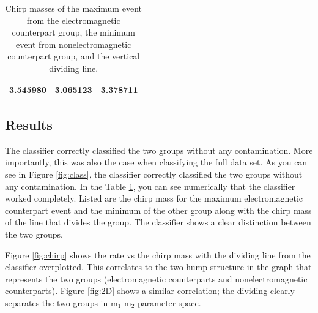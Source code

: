 \begin{table}[ht]
\caption{Chirp masses of the maximum event from the electromagnetic counterpart group, the minimum event from nonelectromagnetic counterpart group, and the vertical dividing line.}
\centering
\begin{tabular}{c c c}

\hline\hline
3.545980 & 3.065123 & 3.378711\\
\hline\hline
\end{tabular}
\label{tab:mass}
\end{table}

\subsection{Results}
The classifier correctly classified the two groups without any contamination. More importantly, this was also the case when classifying the full data set. As you can see in Figure \ref{fig:class}, the classifier correctly classified the two groups without any contamination. In the Table \ref{tab:mass}, you can see numerically that the classifier worked completely. Listed are the chirp mass for the maximum electromagnetic counterpart event and the minimum of the other group along with the chirp mass of the line that divides the group. The classifier shows a clear distinction between the two groups.



Figure \ref{fig:chirp} shows the rate vs the chirp mass with the dividing line from the classifier overplotted. This correlates to the two hump structure in the graph that represents the two groups (electromagnetic counterparts and nonelectromagnetic counterparts). Figure \ref{fig:2D} shows a similar correlation; the dividing clearly separates the two groups in  m$_{1}$-m$_{2}$ parameter space.